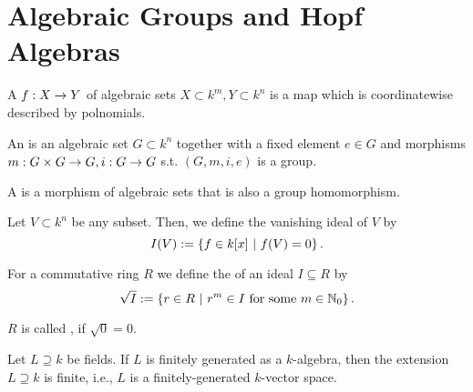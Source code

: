 \section{Algebraic Groups and Hopf Algebras}

\begin{definition}
	A  $f : X \overset{}{\rightarrow} Y$ of algebraic sets $X \subset k^m, Y \subset k^n$ is a map which is coordinatewise described by polnomials.
\end{definition}
\begin{definition}
	An  is an algebraic set $G \subset k^n$ together with a fixed element $e \in G$ and morphisms $m : G \times G \overset{}{\rightarrow} G, i : G \overset{}{\rightarrow} G$ s.t. $(G,m,i,e)$ is a group.
	
	A  is a morphism of algebraic sets that is also a group homomorphism.
\end{definition}

\begin{definition}
	Let $V \subset k^n$ be any subset. Then, we define the vanishing ideal of $V$ by
	\[ I(V) := \left\lbrace f \in k[x] ~ | ~ f(V) = 0\right\rbrace. \]
\end{definition}
\begin{definition}
	For a commutative ring $R$ we define the  of an ideal $I \subseteq R$ by
	\[ \sqrt{I} := \left\lbrace r \in R ~ | ~ r^m \in I~\text{for some }m \in \mathbb{N}_0\right\rbrace. \]
	
	$R$ is called , if $\sqrt{0} = 0$.
\end{definition}

\begin{lemma}
	Let $L \supseteq k$ be fields. If $L$ is finitely generated as a $k$-algebra, then the extension $L \supseteq k$ is finite, i.e., $L$ is a finitely-generated $k$-vector space.
\end{lemma}

